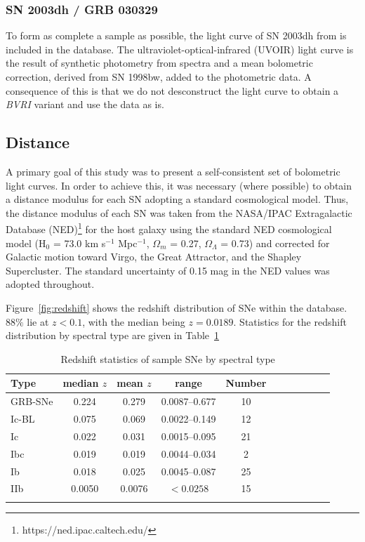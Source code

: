 \documentclass[a4paper,fleqn,usenatbib]{mnras}
\begin{document}
\subsubsection{SN 2003dh / GRB 030329}
To form as complete a sample as possible, the light curve of SN 2003dh from \cite{Deng2005} is included in the database. The ultraviolet-optical-infrared (UVOIR) light curve is the result of synthetic photometry from spectra and a mean bolometric correction, derived from SN 1998bw, added to the photometric data. A consequence of this is that we do not desconstruct the light curve to obtain a {\it BVRI} variant and use the data as is.

\subsection{Distance}

A primary goal of this study was to present a self-consistent set of bolometric light curves. In order to achieve this, it was necessary (where possible) to obtain a distance modulus for each SN adopting a standard cosmological model. Thus, the distance modulus of each SN was taken from the NASA/IPAC Extragalactic Database (NED)\footnote{https://ned.ipac.caltech.edu/} for the host galaxy using the standard NED cosmological model (H$_0$ = 73.0 km s$^{-1}$ Mpc$^{-1}$, $\Omega_m$ = 0.27, $\Omega_\Lambda$ = 0.73) and corrected for Galactic motion toward Virgo, the Great Attractor, and the Shapley Supercluster. The standard uncertainty of 0.15 mag in the NED values was adopted throughout.

Figure~\ref{fig:redshift} shows the redshift distribution of SNe within the database. $88\%$ lie at $z < 0.1$, with the median being $z=0.0189$. Statistics for the redshift distribution by spectral type are given in Table~\ref{zstats} 

\begin{table}
 \begin{minipage}{100mm}
  \caption{Redshift statistics of sample SNe by spectral type}
 \begin{tabular}{@{}lccccccclcc@{}}
  \hline
 Type & median $z$ & mean $z$&  range & Number  \\
  \hline
  GRB-SNe & 0.224 & 0.279 & 0.0087--0.677& 10\\
Ic-BL & 0.075 & 0.069 & 0.0022--0.149&12\\
Ic & 0.022 & 0.031 &0.0015--0.095&21\\
Ibc & 0.019 & 0.019 & 0.0044--0.034 & 2 \\
Ib & 0.018 & 0.025 & 0.0045--0.087& 25 \\
IIb & 0.0050 & 0.0076& $<0.0258$&15\\
\hline
 \label{zstats}
\end{tabular}
\end{minipage}
\end{table}
\end{document}
